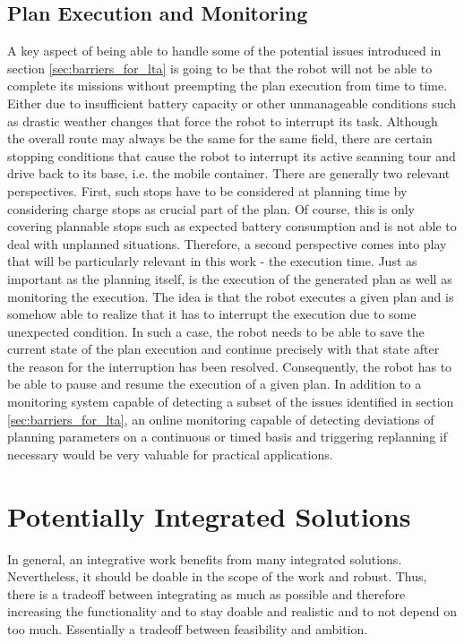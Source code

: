 \documentclass[german, master, expose, latin1]{base/thesis_KBS}
\begin{document}
\subsection{Plan Execution and Monitoring}

A key aspect of being able to handle some of the potential issues introduced in section \ref{sec:barriers_for_lta} is going to be that the robot will not be able to
complete its missions without preempting the plan execution from time to time. Either due to insufficient battery capacity or other unmanageable conditions such as 
drastic weather changes that force the robot to interrupt its task. Although the overall route may always be the same for the same field, there are certain stopping
conditions that cause the robot to interrupt its active scanning tour and drive back to its base, i.e. the mobile container.
There are generally two relevant perspectives. First, such stops have to be considered at planning time by considering charge stops as crucial part of the plan.
Of course, this is only covering plannable stops such as expected battery consumption and is not able to deal with unplanned situations.
Therefore, a second perspective comes into play that will be particularly relevant in this work - the execution time.
Just as important as the planning itself, is the execution of the generated plan as well as monitoring the execution.
The idea is that the robot executes a given plan and is somehow able to realize that it has to interrupt the execution due to some unexpected condition.
In such a case, the robot needs to be able to save the current state of the plan execution and continue precisely with that state after the reason 
for the interruption has been resolved. Consequently, the robot has to be able to pause and resume the execution of a given plan.\newline
In addition to a monitoring system capable of detecting a subset of the issues identified in section \ref{sec:barriers_for_lta},
an online monitoring capable of detecting deviations of planning parameters on a continuous or timed basis and triggering replanning if necessary would
be very valuable for practical applications.

\section{Potentially Integrated Solutions}

In general, an integrative work benefits from many integrated solutions. Nevertheless, it should be doable in the scope of the work and robust.
Thus, there is a tradeoff between integrating as much as possible and therefore increasing the functionality and to stay doable and realistic and to not depend on too much.
Essentially a tradeoff between feasibility and ambition.\newline
\end{document}
